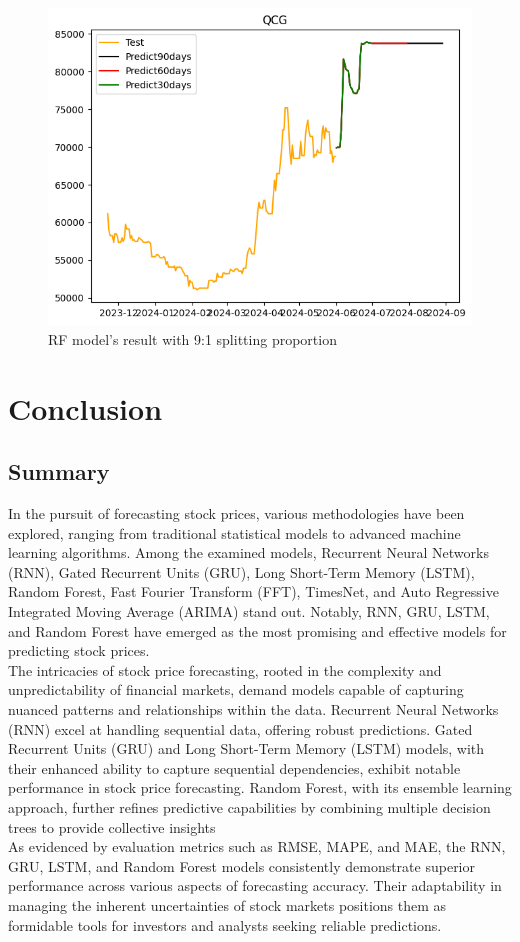 \documentclass{ieeeojies}
\begin{document}
\begin{figure}[H]
  \centering
  \begin{minipage}{0.8\linewidth}
    \centering
        \includegraphics[width=\linewidth]{bibliography/Figure/QCGRF_9-1.png}
    \caption{RF model’s result with 9:1 splitting proportion}
    \label{fig28}
  \end{minipage}
\end{figure}
\section{Conclusion}
\subsection{Summary}
In the pursuit of forecasting stock prices, various methodologies have been explored, ranging from traditional statistical models to advanced machine learning algorithms. Among the examined models, Recurrent Neural Networks (RNN), Gated Recurrent Units (GRU), Long Short-Term Memory (LSTM), Random Forest, Fast Fourier Transform (FFT), TimesNet, and Auto Regressive Integrated Moving Average (ARIMA) stand out. Notably, RNN, GRU, LSTM, and Random Forest have emerged as the most promising and effective models for predicting stock prices.\\
The intricacies of stock price forecasting, rooted in the complexity and unpredictability of financial markets, demand models capable of capturing nuanced patterns and relationships within the data. Recurrent Neural Networks (RNN) excel at handling sequential data, offering robust predictions. Gated Recurrent Units (GRU) and Long Short-Term Memory (LSTM) models, with their enhanced ability to capture sequential dependencies, exhibit notable performance in stock price forecasting. Random Forest, with its ensemble learning approach, further refines predictive capabilities by combining multiple decision trees to provide collective insights\\
As evidenced by evaluation metrics such as RMSE, MAPE, and MAE, the RNN, GRU, LSTM, and Random Forest models consistently demonstrate superior performance across various aspects of forecasting accuracy. Their adaptability in managing the inherent uncertainties of stock markets positions them as formidable tools for investors and analysts seeking reliable predictions.\\
\end{document}
